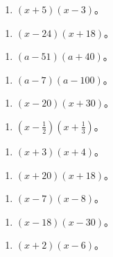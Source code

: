 \begin{enumerate}[start=9]
\item
  \((x + 5)(x - 3)\)。
\end{enumerate}

\begin{enumerate}[start=11]
\item
  \((x - 24)(x + 18)\)。
\end{enumerate}

\begin{enumerate}[start=13]
\item
  \((a - 51)(a + 40)\)。
\end{enumerate}

\begin{enumerate}[start=15]
\item
  \((a - 7)(a - 100)\)。
\end{enumerate}

\begin{enumerate}[start=17]
\item
  \((x - 20)(x + 30)\)。
\end{enumerate}

\begin{enumerate}[start=19]
\item
  \(\left(x - \frac{1}{2}\right)\left(x + \frac{1}{3}\right)\)。
\end{enumerate}

\begin{enumerate}[start=2]
\item
  \((x + 3)(x + 4)\)。
\end{enumerate}

\begin{enumerate}[start=4]
\item
  \((x + 20)(x + 18)\)。
\end{enumerate}

\begin{enumerate}[start=6]
\item
  \((x - 7)(x - 8)\)。
\end{enumerate}

\begin{enumerate}[start=8]
\item
  \((x - 18)(x - 30)\)。
\end{enumerate}

\begin{enumerate}[start=10]
\item
  \((x + 2)(x - 6)\)。
\end{enumerate}

